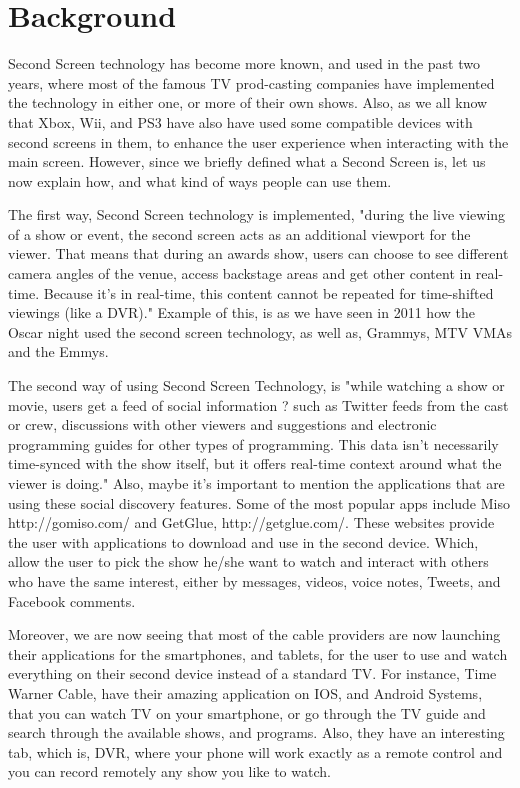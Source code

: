 \documentclass[12pt, oneside]{amsart}   	%
\begin{document}
 \section{Background}

 Second Screen technology has become more known, and used in the past two years, where most of the famous TV prod-casting companies have implemented the technology in either one, or more of their own shows.  Also, as we all know that Xbox, Wii, and PS3 have also have used some compatible devices with second screens in them, to enhance the user experience when interacting with the main screen.
 However, since we briefly defined what a Second Screen is, let us now explain how, and what kind of ways people can use them.  

The first way, Second Screen technology is implemented, "during the live viewing of a show or event, the second screen acts as an additional viewport for the viewer. That means that during an awards show, users can choose to see different camera angles of the venue, access backstage areas and get other content in real-time. Because it's in real-time, this content cannot be repeated for time-shifted viewings (like a DVR)."\cite{Second-Screen-His} Example of this, is as we have seen in 2011 how the Oscar night used the second screen technology, as well as, Grammys, MTV VMAs and the Emmys.\cite{Second-Screen-His}

 The second way of using Second Screen Technology, is "while watching a show or movie, users get a feed of social information ? such as Twitter feeds from the cast or crew, discussions with other viewers and suggestions and electronic programming guides for other types of programming. This data isn't necessarily time-synced with the show itself, but it offers real-time context around what the viewer is doing."\cite{Second-Screen-His} Also, maybe it's important to mention the applications that are using these social discovery features. Some of the most popular apps include Miso http://gomiso.com/ and GetGlue, http://getglue.com/. \cite{Second-Screen-Art} These websites provide the user with applications to download and use in the second device.  Which, allow the user to pick the show he/she want to watch and interact with others who have the same interest, either by messages, videos, voice notes, Tweets, and Facebook comments.

Moreover, we are now seeing that most of the cable providers are now launching their applications for the smartphones, and tablets, for the user to use and watch everything on their second device instead of a standard TV.  For instance, Time Warner Cable, have their amazing application on IOS, and Android Systems, that you can watch TV on your smartphone, or go through the TV guide and search through the available shows, and programs.  Also, they have an interesting tab, which is, DVR, where your phone will work exactly as a remote control and you can record remotely any show you like to watch.  
\end{document}
